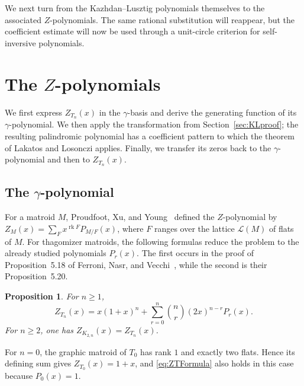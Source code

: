 \documentclass[11pt]{article}
\theoremstyle{plain}
\newtheorem{proposition}[theorem]{Proposition}
\theoremstyle{remark}
\DeclareMathOperator{\rk}{rk}
\begin{document}
We next turn from the Kazhdan--Lusztig polynomials themselves to the
associated $Z$-polynomials.  The same rational substitution will
reappear, but the coefficient estimate will now be used through a
unit-circle criterion for self-inversive polynomials.

\section{The \texorpdfstring{$Z$}{Z}-polynomials}\label{sec:Zpolynomials}

We first express $Z_{T_n}(x)$ in the $\gamma$-basis and derive the
generating function of its $\gamma$-polynomial.  We then apply the
transformation from Section~\ref{sec:KLproof}; the resulting
palindromic polynomial has a coefficient pattern to which the theorem
of Lakatos and Losonczi applies.  Finally, we transfer its zeros back
to the $\gamma$-polynomial and then to $Z_{T_n}(x)$.

\subsection{The \texorpdfstring{$\gamma$}{gamma}-polynomial}

For a matroid $M$, Proudfoot, Xu, and
Young~\cite[Definition~2.1]{ProudfootXuYoung} defined the
$Z$-polynomial by $Z_M(x)=\sum_F x^{\rk F}P_{M/F}(x)$, where $F$
ranges over the lattice $\mathcal L(M)$ of flats of $M$.  For thagomizer
matroids, the following formulas reduce the problem to the already
studied polynomials $P_r(x)$.  The first occurs in the proof of
Proposition~5.18 of Ferroni, Nasr, and
Vecchi~\cite{FerroniNasrVecchiGamma}, while the second is their
Proposition~5.20.

\begin{proposition}\label{prop:ZFormulas}
For $n\ge1$,
\begin{equation}\label{eq:ZTFormula}
Z_{T_n}(x)=x(1+x)^n+
\sum_{r=0}^n\binom nr(2x)^{n-r}P_r(x).
\end{equation}
For $n\ge2$, one has $Z_{K_{2,n}}(x)=Z_{T_n}(x)$.
\end{proposition}

For $n=0$, the graphic matroid of $T_0$ has rank $1$ and exactly two
flats.  Hence its defining sum gives $Z_{T_0}(x)=1+x$, and
\eqref{eq:ZTFormula} also holds in this case because $P_0(x)=1$.
\end{document}
